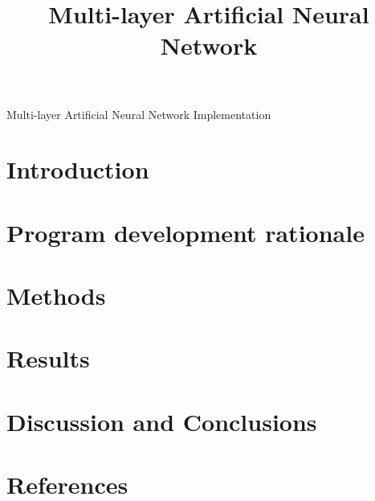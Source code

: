 \documentclass{article}
\begin{document}
\title{Multi-layer Artificial Neural Network}

\begin{center}
  \Large{Multi-layer Artificial Neural Network Implementation}
\end{center}

\section{Introduction}

\section{Program development rationale}

\section{Methods}

\section{Results}

\section{Discussion and Conclusions}

\section{References}
\end{document}
